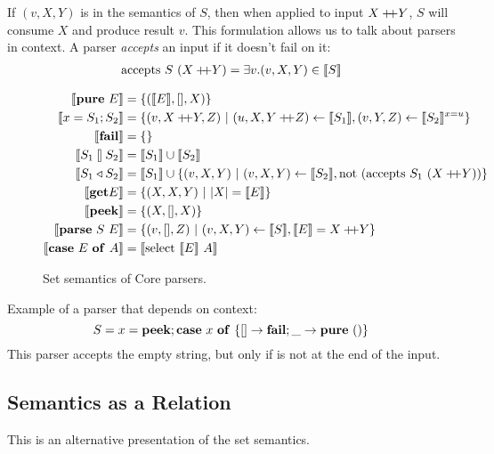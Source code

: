 \documentclass{article}
\begin{document}
If $(v,X,Y)$ is in the semantics of $S$, then when applied to
input $X +\!\!\!+ Y$, $S$ will consume $X$ and produce result $v$.
This formulation allows us to talk about parsers in context.
A parser {\em accepts} an input if it doesn't fail on it:
\begin{align*}
\mathrm{accepts}~ S~(X +\!\!\!+ Y) &= \exists v. (v,X,Y) \in \llbracket{S}\rrbracket \\
\end{align*}

\begin{figure}[H]
\begin{align*}
\sem {\gPure E} &= \set{ (\sem E, [], X) } \\
\sem {\gBind x {S_1} {S_2}} &=
  \set{ (v,X \append Y,Z) ~|~ (u,X,Y \append Z) \from \sem{S_1},
                              (v,Y,Z)           \from \sem{S_2}^{x=u} } \\
\sem{\gFail} &= \set{ } \\
\sem{\gOr {S_1} {S_2}} &= \sem{S_1} \union \sem{S_2} \\
\sem{\gOrB {S_1} {S_2}} &= \sem{S_1} \union
  \set { (v,X,Y) ~|~ (v,X,Y) \from \sem{S_2},
                     \fun{not} (\fun{accepts} S_1~(X \append Y)) } \\
\sem{\gGet E} &= \set{ (X, X, Y) ~|~ |X| = \sem{E} } \\
\sem{\gGetS}  &= \set{ (X, [], X) } \\
\sem{\gParse S E} &= \set{ (v,[],Z) ~|~ (v,X,Y) \from \sem{S},
                                        \sem{E} = X \append Y} \\
\sem{\gCase E A} &= \sem {\caseSelect {\sem E} A}
\end{align*}
\caption{Set semantics of Core parsers.}
\end{figure}

Example of a parser that depends on context:
\begin{equation*}
S = {x} = {\mathbf{peek}}; {\mathbf{case}~{x}~\mathbf{of}~{\{{[] \to \mathbf{fail}; \_ \to \mathbf{pure}~{()}}\}}}
\end{equation*}
This parser accepts the empty string, but only if is not at the end
of the input.


\subsection{Semantics as a Relation}

This is an alternative presentation of the set semantics.
\end{document}
